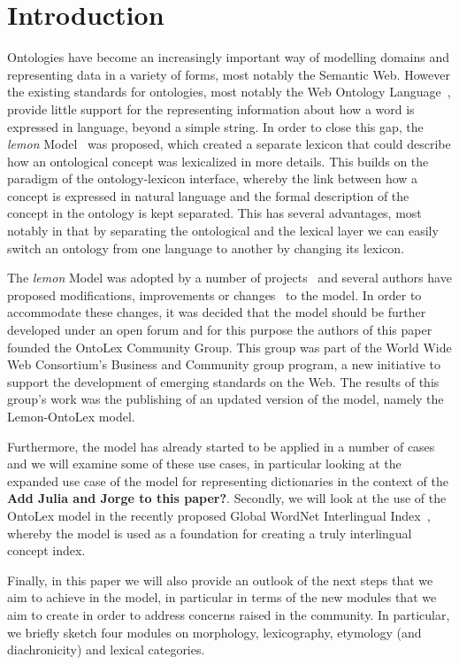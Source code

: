 \documentclass[12pt,a4paper]{elex2017}
\begin{document}
\section{Introduction}

Ontologies have become an increasingly important way of modelling domains and
representing data in a variety of forms, most notably the Semantic Web. However
the existing standards for ontologies, most notably the Web Ontology
Language~\cite[OWL]{mcguinness2004ow}, provide little support for the
representing information about how a word is expressed in language, beyond a
simple string. In order to close this gap, the \emph{lemon}
Model~\cite{mccrae2012interchanging} was proposed, which created a separate
lexicon that could describe how an ontological concept was lexicalized in more
details. This builds on the paradigm of the ontology-lexicon interface, whereby
the link between how a concept is expressed in natural language and the formal
description of the concept in the ontology is kept separated. This has several
advantages, most notably in that by separating the ontological and the lexical
layer we can easily switch an ontology from one language to another by changing
its lexicon. 

The \emph{lemon} Model was adopted by a number of projects~\cite{todo} and
several authors have proposed modifications, improvements or changes~\cite{todo}
to the model. In order to accommodate these changes, it was decided that the
model should be further developed under an open forum and for this purpose the
authors of this paper founded the OntoLex Community Group. This group was part
of the World Wide Web Consortium's Business and Community group program, a new
initiative to support the development of emerging standards on the Web. The
results of this group's work was the publishing of an updated version of the
model, namely the Lemon-OntoLex model.

Furthermore, the model has already started to be applied in a number of cases
and we will examine some of these use cases, in particular looking at the
expanded use case of the model for representing dictionaries in the context of
the \textbf{Add Julia and Jorge to this paper?}. Secondly, we will look at the
use of the OntoLex model in the recently proposed Global WordNet Interlingual
Index~\cite{vossen2016toward,bond2016cili}, whereby the model is used as a
foundation for creating a truly interlingual concept index.

Finally, in this paper we will also provide an outlook of the next steps that we
aim to achieve in the model, in particular in terms of the new modules that we
aim to create in order to address concerns raised in the community. In
particular, we briefly sketch four modules on morphology, lexicography,
etymology (and diachronicity) and lexical categories.
\end{document}
